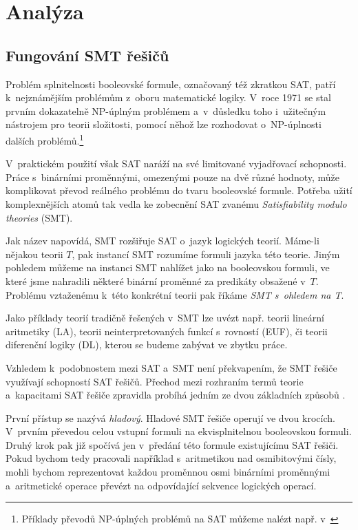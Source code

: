 \chapter{Analýza}

\section{Fungování SMT řešičů}

Problém splnitelnosti booleovské formule, označovaný též zkratkou SAT, patří k~nejznámějším problémům z~oboru matematické logiky. V~roce 1971 se stal prvním dokazatelně NP-úplným problémem \cite{Cook71} a~v~důsledku toho i~užitečným nástrojem pro teorii složitosti, pomocí něhož lze rozhodovat o~NP-úplnosti dalších problémů.\footnote{Příklady převodů NP-úplných problémů na SAT můžeme nalézt např. v~\cite[kapitola 19]{Mares17}}

V~praktickém použití však SAT naráží na své limitované vyjadřovací schopnosti. Práce s~binárními proměnnými, omezenými pouze na dvě různé hodnoty, může komplikovat převod reálného problému do tvaru booleovské formule. Potřeba užití komplexnějších atomů tak vedla ke zobecnění SAT zvanému \emph{Satisfiability modulo theories} (SMT).

Jak název napovídá, SMT rozšiřuje SAT o~jazyk logických teorií. Máme-li nějakou teorii $T$, pak instancí SMT rozumíme formuli jazyka této teorie. Jiným pohledem můžeme na instanci SMT nahlížet jako na booleovskou formuli, ve které jsme nahradili některé binární proměnné za predikáty obsažené v~$T$. Problému vztaženému k~této konkrétní teorii pak říkáme \emph{SMT s~ohledem na T}.

Jako příklady teorií tradičně řešených v~SMT lze uvézt např. teorii lineární aritmetiky (LA), teorii neinterpretovaných funkcí s~rovností (EUF), či teorii diferenční logiky (DL), kterou se budeme zabývat ve zbytku práce.

Vzhledem k~podobnostem mezi SAT a~SMT není překvapením, že SMT řešiče využívají schopností SAT řešičů. Přechod mezi rozhraním termů teorie a~kapacitami SAT řešiče zpravidla probíhá jedním ze dvou základních způsobů \cite{Etessami05}.

První přístup se nazývá \emph{hladový}. Hladové SMT řešiče operují ve dvou krocích. V~prvním převedou celou vstupní formuli na ekvisplnitelnou booleovskou formuli. Druhý krok pak již spočívá jen v~předání této formule existujícímu SAT řešiči. Pokud bychom tedy pracovali například s~aritmetikou nad osmibitovými čísly, mohli bychom reprezentovat každou proměnnou osmi binárními proměnnými a~aritmetické operace převézt na odpovídající sekvence logických operací.

